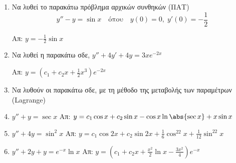 \begin{enumerate}
\item Να λυθεί το παρακάτω πρόβλημα αρχικών συνθηκών (ΠΑΤ) 
\[
y''-y=\sin x \quad \text{όπου}\quad y(0)=0,\; y'(0)=-\frac{1}{2}
\]

\hfill Απ: $y=-\frac{1}{2}\sin x$

\item Να λυθεί η παρακάτω σδε, $y''+4y'+4y=3xe^{-2x}$

\hfill Απ: $y=(c_1+c_2x+\frac{1}{2}x^3)e^{-2x}$

\item Να λυθούν οι παρακάτω σδε, με τη μέθοδο της μεταβολής των παραμέτρων (Lagrange)

\item $y''+y=\sec x$ \hfill Απ: $y=c_1\cos x+c_2\sin x - \cos x\ln\abs{\sec x}+x\sin x$
\item $y''+4y=\sin^2x$ 
  \hfill Απ: $y=c_1\cos 2x+c_2\sin 2x+\frac{1}{6}\cos^22x+\frac{1}{12}\sin^22x$
\item $y''+2y+y=e^{-x}\ln x$ 
  \hfill Απ: $y=(c_1+c_2x+\frac{x^2}{2}\ln x-\frac{3x^2}{4})e^{-x}$
\end{enumerate}




